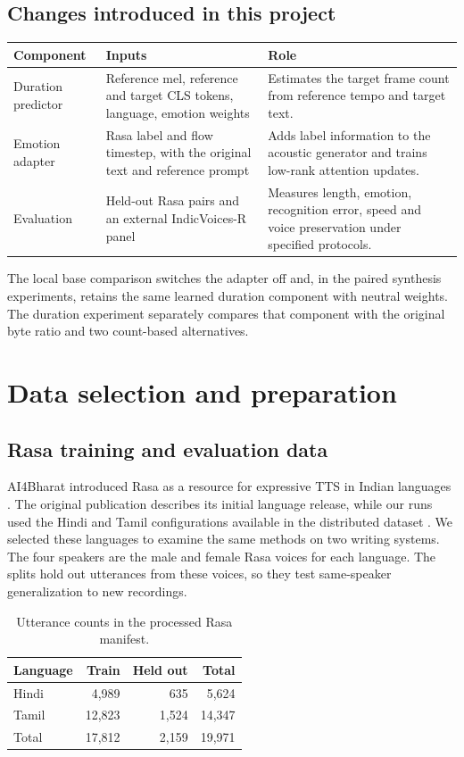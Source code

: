 \documentclass[11pt,a4paper]{article}
\newcommand{\sectionpage}[1]{\clearpage\section{#1}}
\begin{document}
\subsection{Changes introduced in this project}
\begin{tabularx}{\linewidth}{@{}p{31mm}YY@{}}
\toprule
Component & Inputs & Role \\
\midrule
Duration predictor & Reference mel, reference and target CLS tokens, language, emotion weights & Estimates the target frame count from reference tempo and target text. \\
Emotion adapter & Rasa label and flow timestep, with the original text and reference prompt & Adds label information to the acoustic generator and trains low-rank attention updates. \\
Evaluation & Held-out Rasa pairs and an external IndicVoices-R panel & Measures length, emotion, recognition error, speed and voice preservation under specified protocols. \\
\bottomrule
\end{tabularx}

The local base comparison switches the adapter off and, in the paired synthesis experiments, retains the same learned duration component with neutral weights. The duration experiment separately compares that component with the original byte ratio and two count-based alternatives.

\sectionpage{Data selection and preparation}
\subsection{Rasa training and evaluation data}
AI4Bharat introduced Rasa as a resource for expressive TTS in Indian languages \cite{rasa}. The original publication describes its initial language release, while our runs used the Hindi and Tamil configurations available in the distributed dataset \cite{rasacard}. We selected these languages to examine the same methods on two writing systems. The four speakers are the male and female Rasa voices for each language. The splits hold out utterances from these voices, so they test same-speaker generalization to new recordings.

\begin{table}[!h]
\centering
\caption{Utterance counts in the processed Rasa manifest.}
\begin{tabular}{@{}lrrr@{}}
\toprule
Language & Train & Held out & Total \\
\midrule
Hindi & 4,989 & 635 & 5,624 \\
Tamil & 12,823 & 1,524 & 14,347 \\
\midrule
Total & 17,812 & 2,159 & 19,971 \\
\bottomrule
\end{tabular}
\end{table}
\end{document}

